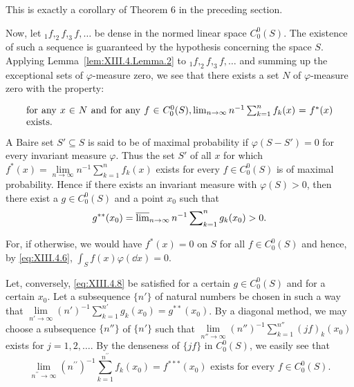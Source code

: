 This is exactly a corollary of Theorem $6$ in the preceding section. 

Now, let $_1f, _2f, _3f, \ldots$ be dense in the normed linear space $C_0^0(S)$. The existence of such a sequence is guaranteed by the hypothesis concerning the space $S$. Applying Lemma~\ref{lem:XIII.4.Lemma.2} to $_1f, _2f, _3f, \ldots$ and summing up the exceptional sets of $\varphi$-measure zero, we see that there exists a set $N$ of $\varphi$-measure zero with the property: 

\begin{equation}
\label{eq:XIII.4.7}
\begin{minipage}{0.92\linewidth}
\everymath{}\let\limits\nolimits
for any $x \in N$ and for any $f \in C_0^0(S), \lim\limits_{n \to \infty} n^{-1} \sum\limits_{k=1}^{n} f_k(x) = f^*(x)$ exists.
\end{minipage}
\end{equation}

A Baire set $S' \subseteq S$ is said to be of maximal probability if $\varphi(S - S') = 0$ for every invariant measure $\varphi$. Thus the set $S'$ of all $x$ for which $f^*(x) = \lim\limits_{n \to \infty} n^{-1} \sum\limits_{k=1}^{n} f_k(x)$ exists for every $f \in C_0^0(S)$ is of maximal probability. Hence if there exists an invariant measure with $\varphi(S) > 0$, then there exist a $g \in C_0^0(S)$ and a point $x_0$ such that 
\begin{equation}\label{eq:XIII.4.8}
g ^{**} (x _{0}) = \varlimsup\limits_{n \rightarrow \infty} n ^{-1} \sum\limits_{k=1} ^{n} g _{k} (x _{0}) > 0.
\end{equation}

For, if otherwise, we would have $f^{*}(x) = 0$ on $S$ for all $f \in C_0^0(S)$ and hence, by \eqref{eq:XIII.4.6}, $\int_{S} f(x) \varphi(\dd x) = 0$. 

Let, conversely, \eqref{eq:XIII.4.8} be satisfied for a certain $g \in C_0^0(S)$ and for a certain $x_0$. Let a subsequence $\{n'\}$ of natural numbers be chosen in such a way that $\lim\limits_{n' \to \infty} (n')^{-1} \sum\limits_{k=1}^{n'} g_k(x_0) = g^{**}(x_0)$. By a diagonal method, we may choose a subsequence $\{n''\}$ of $\{n'\}$ such that $\lim\limits_{n'' \to \infty} (n'')^{-1} \sum\limits_{k=1}^{n''} (jf)_k(x_0)$ exists for $j = 1, 2, \ldots$. By the denseness of $\{jf\}$ in $C_0^0(S)$, we easily see that 
\[
\lim\limits _ {n ^{\prime \prime} \rightarrow \infty} (n ^{\prime \prime}) ^{-1} \sum\limits_{k=1} ^ {n ^{\prime \prime}} f _{k} (x _{0}) = f ^{***} (x _{0}) \text{ exists for every } f \in C _{0} ^{0} (S).
\]


